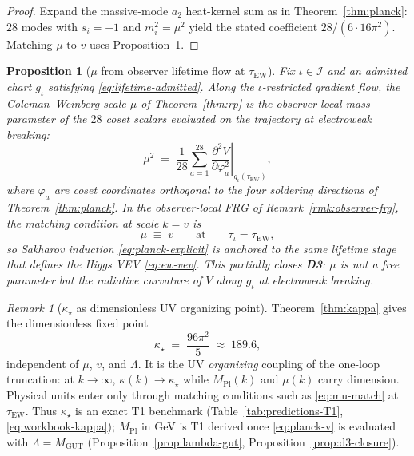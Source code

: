 \documentclass[aps,prd,onecolumn,amsmath,amssymb,nofootinbib,11pt]{revtex4-2}
\numberwithin{equation}{section}
\theoremstyle{plain}
\newtheorem{proposition}[theorem]{Proposition}
\theoremstyle{definition}
\theoremstyle{remark}
\newtheorem{remark}[theorem]{Remark}
\newcommand{\MPl}{M_{\mathrm{Pl}}}
\begin{document}
\begin{proof}
Expand the massive-mode $a_2$ heat-kernel sum as in
Theorem~\ref{thm:planck}: $28$ modes with $s_i=+1$ and $m_i^2=\mu^2$ yield
the stated coefficient $28/(6\cdot16\pi^2)$. Matching $\mu$ to $v$ uses
Proposition~\ref{prop:mu-lifetime}.
\end{proof}

\begin{proposition}[$\mu$ from observer lifetime flow at $\tau_{\mathrm{EW}}$]
\label{prop:mu-lifetime}
Fix $\iota\in\mathcal{I}$ and an admitted chart $g_\iota$ satisfying
\eqref{eq:lifetime-admitted}. Along the $\iota$-restricted gradient flow,
the Coleman--Weinberg scale $\mu$ of Theorem~\ref{thm:rp} is the
\emph{observer-local} mass parameter of the $28$ coset scalars evaluated on
the trajectory at electroweak breaking:
\begin{equation}\label{eq:mu-tau-ew}
  \mu^2
  \;=\;
  \frac{1}{28}\sum_{a=1}^{28}
  \left.\frac{\partial^2 V}{\partial\varphi_a^2}\right|_{g_\iota(\tau_{\mathrm{EW}})},
\end{equation}
where $\varphi_a$ are coset coordinates orthogonal to the four soldering
directions of Theorem~\ref{thm:planck}. In the observer-local FRG of
Remark~\ref{rmk:observer-frg}, the matching condition at scale $k=v$ is
\begin{equation}\label{eq:mu-match}
  \mu\;\equiv\;v
  \qquad\text{at}\qquad
  \tau_\iota=\tau_{\mathrm{EW}},
\end{equation}
so Sakharov induction \eqref{eq:planck-explicit} is anchored to the same
lifetime stage that defines the Higgs VEV \eqref{eq:ew-vev}. This partially
closes \textbf{D3}: $\mu$ is not a free parameter but the radiative curvature
of $V$ along $g_\iota$ at electroweak breaking.
\end{proposition}

\begin{remark}[$\kappa_\star$ as dimensionless UV organizing point]
\label{rmk:kappa-star-organizing}
Theorem~\ref{thm:kappa} gives the dimensionless fixed point
\begin{equation}\label{eq:kappa-star-value}
  \kappa_\star \;=\; \frac{96\pi^2}{5} \;\approx\; 189.6,
\end{equation}
independent of $\mu$, $v$, and $\Lambda$. It is the UV \emph{organizing}
coupling of the one-loop truncation: at $k\to\infty$,
$\kappa(k)\to\kappa_\star$ while $\MPl(k)$ and $\mu(k)$ carry dimension.
Physical units enter only through matching conditions such as
\eqref{eq:mu-match} at $\tau_{\mathrm{EW}}$. Thus $\kappa_\star$ is an exact
T1 benchmark (Table~\ref{tab:predictions-T1},
\eqref{eq:workbook-kappa}); $\MPl$ in GeV is T1 derived once
\eqref{eq:planck-v} is evaluated with $\Lambda=M_{\mathrm{GUT}}$
(Proposition~\ref{prop:lambda-gut}, Proposition~\ref{prop:d3-closure}).
\end{remark}
\end{document}

